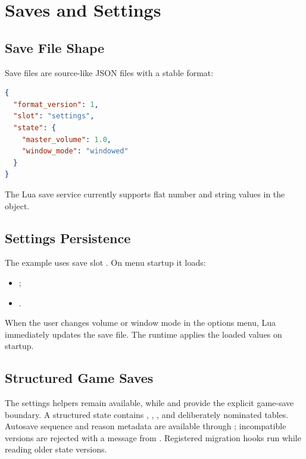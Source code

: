 \chapter{Saves and Settings}

\section{Save File Shape}

Save files are source-like JSON files with a stable format:

\begin{lstlisting}[language=json]
{
  "format_version": 1,
  "slot": "settings",
  "state": {
    "master_volume": 1.0,
    "window_mode": "windowed"
  }
}
\end{lstlisting}

The Lua save service currently supports flat number and string values in the  object.

\section{Settings Persistence}

The  example uses save slot . On menu startup it loads:

\begin{itemize}
  \item {};
  \item {}.
\end{itemize}

When the user changes volume or window mode in the options menu, Lua immediately updates the save file. The runtime applies the loaded values on startup.

\section{Structured Game Saves}

The settings helpers remain available, while  and
 provide the explicit game-save boundary. A structured
state contains , ,
, and deliberately nominated  tables.
Autosave sequence and reason metadata are available through
; incompatible versions are rejected with a message from
. Registered migration hooks run while reading older
state versions.
